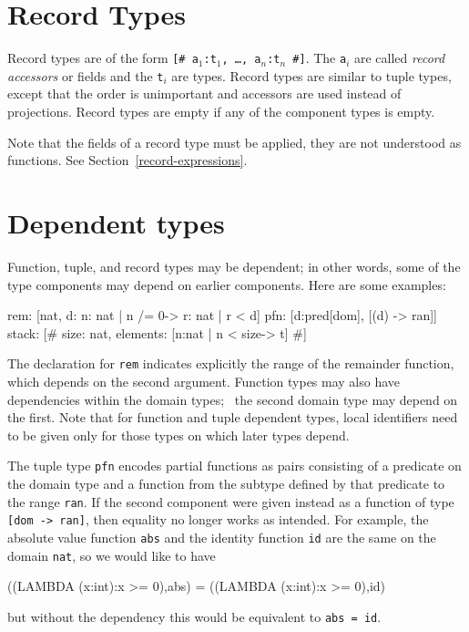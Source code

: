 
\section{Record Types}\label{record-types}

Record types are of the form \texttt{[\# a$_1$:t$_1$, \ldots, a$_n$:t$_n$
\#]}.  The \texttt{a$_i$} are called \emph{record accessors} or fields and the \texttt{t$_i$} are types.  Record types are
similar to tuple types, except that the order is unimportant and accessors
are used instead of projections.  Record types are empty if any of the
component types is empty.

Note that the fields of a record type must be applied, they are not
understood as functions.  See Section~\ref{record-expressions}.


\section{Dependent types}\label{dependent-types}

Function, tuple, and record types may be dependent; in other words, some
of the type components may depend on earlier components.  Here are some
examples:
\begin{pvsex}
  rem: [nat, d: \setb{}n: nat | n /= 0\sete -> \setb{}r: nat | r < d\sete]
  pfn: [d:pred[dom], [(d) -> ran]]
  stack: [\# size: nat, elements: [\setb{}n:nat | n < size\sete -> t] \#]
\end{pvsex}
The declaration for \texttt{rem} indicates explicitly the range of the
remainder function, which depends on the second argument.  Function types
may also have dependencies within the domain types; \eg\ the second domain
type may depend on the first.  Note that for function and tuple dependent
types, local identifiers need to be given only for those types on which
later types depend.

The tuple type \texttt{pfn} encodes partial functions as pairs consisting
of a predicate on the domain type and a function from the subtype
defined by that predicate to the range \texttt{ran}.  If the second
component were given instead as a function of type \texttt{[dom -> ran]},
then equality no longer works as intended.  For example, the absolute
value function \texttt{abs} and the identity function \texttt{id} are the same
on the domain \texttt{nat}, so we would like to have
\begin{pvsex}
  ((LAMBDA (x:int):x >= 0),abs) = ((LAMBDA (x:int):x >= 0),id)
\end{pvsex}
%
but without the dependency this would be equivalent to \texttt{abs = id}.


